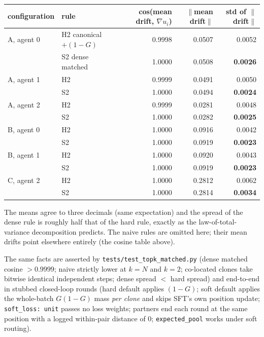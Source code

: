 \documentclass[11pt]{article}
\theoremstyle{remark}
\newcommand{\cfg}[1]{\texttt{#1}}
\begin{document}
\begin{center}
\footnotesize
\begin{tabular}{@{}llrrr@{}}
\toprule
configuration & rule & cos(mean drift, $\nabla u_i$) & $\|$mean drift$\|$ & std of $\|$drift$\|$ \\
\midrule
A, agent 0 & H2 canonical$+(1{-}G)$ & 0.9998 & 0.0507 & 0.0052 \\
           & S2 dense matched        & 1.0000 & 0.0508 & \textbf{0.0026} \\
A, agent 1 & H2 & 0.9999 & 0.0491 & 0.0050 \\
           & S2 & 1.0000 & 0.0494 & \textbf{0.0024} \\
A, agent 2 & H2 & 0.9999 & 0.0281 & 0.0048 \\
           & S2 & 1.0000 & 0.0282 & \textbf{0.0025} \\
\midrule
B, agent 0 & H2 & 1.0000 & 0.0916 & 0.0042 \\
           & S2 & 1.0000 & 0.0919 & \textbf{0.0023} \\
B, agent 1 & H2 & 1.0000 & 0.0920 & 0.0043 \\
           & S2 & 1.0000 & 0.0919 & \textbf{0.0023} \\
\midrule
C, agent 2 & H2 & 1.0000 & 0.2812 & 0.0062 \\
           & S2 & 1.0000 & 0.2814 & \textbf{0.0034} \\
\bottomrule
\end{tabular}
\end{center}

\noindent The means agree to three decimals (same expectation) and the
spread of the dense rule is roughly half that of the hard rule, exactly as
the law-of-total-variance decomposition predicts. The naive rules are
omitted here; their mean drifts point elsewhere entirely (the cosine table
above).

The same facts are asserted by \texttt{tests/test\_topk\_matched.py}
(dense matched cosine $>0.9999$; naive strictly lower at $k=N$ and $k=2$;
co-located clones take bitwise identical independent steps; dense spread
$<$ hard spread) and end-to-end in stubbed closed-loop rounds (hard default
applies $(1-G)$; soft default applies the whole-batch $G(1-G)$ mass
\emph{per clone} and skips SFT's own position update; \cfg{soft\_loss: unit}
passes no loss weights; partners end each round at the same position with a
logged within-pair distance of $0$; \cfg{expected\_pool} works under soft
routing).

\end{document}
